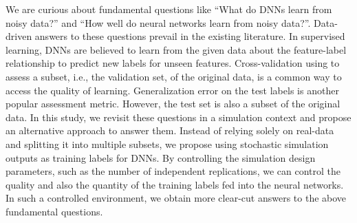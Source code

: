 We are curious about fundamental questions like ``What do DNNs learn from noisy data?'' and ``How well do neural networks learn from noisy data?''.
Data-driven answers to these questions prevail in the existing literature.
In supervised learning, DNNs are believed to learn from the given data about the feature-label relationship to predict new labels for unseen features.
Cross-validation using to assess a subset, i.e., the validation set, of the original data, is a common way to access the quality of learning.
Generalization error on the test labels is another popular assessment metric.
However, the test set is also a subset of the original data.
In this study, we revisit these questions in a simulation context and propose an alternative approach to answer them.
Instead of relying solely on real-data and splitting it into multiple subsets, we propose using stochastic simulation outputs as training labels for DNNs.
By controlling the simulation design parameters, such as the number of independent replications, we can control the quality and also the quantity of the training labels fed into the neural networks.
In such a controlled environment, we obtain more clear-cut answers to the above fundamental questions.

